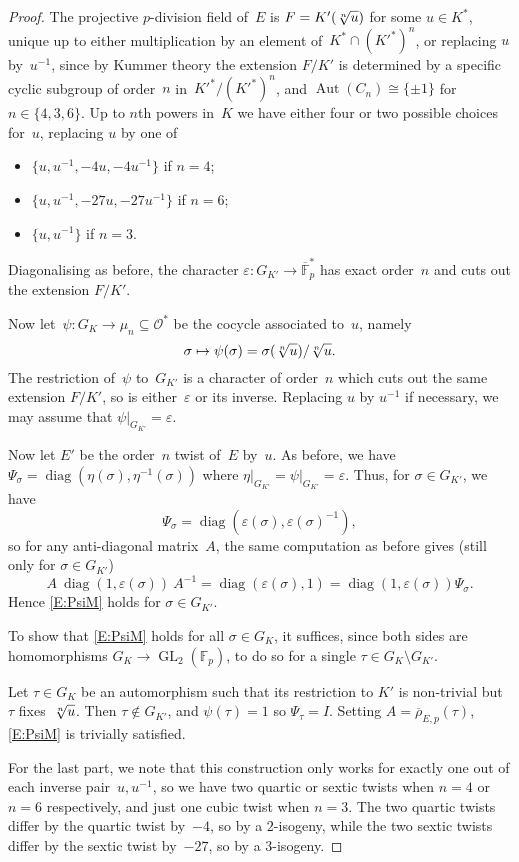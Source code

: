 \documentclass[12pt, reqno]{amsart}
\newcommand{\F}{\mathbb{F}}
\newcommand{\rhobar}{{\overline{\rho}}}
\newcommand{\eps}{\varepsilon}
\newcommand{\calO}{\mathcal{O}}
\DeclareMathOperator{\Aut}{Aut}
\newcommand{\GL}{\operatorname{GL}}
\newcommand{\diag}{{\operatorname{diag}}}
\numberwithin{equation}{section}
\theoremstyle{definition}
\theoremstyle{remark}
\begin{document}
\begin{proof}
The projective $p$-division field of~$E$ is $F=K'(\root n\of u)$ for
some $u\in K^*$, unique up to either multiplication by an element
of~$K^*\cap(K'^*)^n$, or replacing $u$ by~$u^{-1}$, since by Kummer
theory the extension $F/K'$ is determined by a specific cyclic subgroup
of order~$n$ in~$K'^*/(K'^*)^n$, and $\Aut(C_n)\cong\{\pm1\}$ for
$n\in\{4,3,6\}$.  Up to $n$th powers in~$K$ we have either four or two
possible choices for~$u$, replacing $u$ by one of
\begin{itemize}
  \item $\{u, u^{-1}, -4u, -4u^{-1}\}$ if $n=4$;
  \item $\{u, u^{-1}, -27u, -27u^{-1}\}$ if $n=6$;
  \item $\{u, u^{-1}\}$ if $n=3$.
\end{itemize}
Diagonalising as before, the character $\eps:G_{K'} \to
\overline{\F}_p^*$ has exact order~$n$ and cuts out the extension
$F/K'$.

Now let~$\psi:G_K\to \mu_n\subseteq\calO^*$ be the cocycle associated
to~$u$, namely
\[
\sigma\mapsto \psi(\sigma) = \sigma(\root n\of u)/\root n\of u.
\]
The restriction of~$\psi$ to~$G_{K'}$ is a character of order~$n$
which cuts out the same extension $F/K'$, so is either~$\eps$ or its
inverse.  Replacing $u$ by $u^{-1}$ if necessary, we may assume that
$\left.\psi\right|_{G_{K'}} = \eps$.

Now let $E'$ be the order~$n$ twist of~$E$ by~$u$.  As before, we have
$\Psi_{\sigma}=\diag(\eta(\sigma),\eta^{-1}(\sigma))$ where
$\left.\eta\right|_{G_{K'}} = \left.\psi\right|_{G_{K'}} = \eps$.
Thus, for $\sigma\in G_{K'}$, we have
\[
\Psi_{\sigma} = \diag(\eps(\sigma),\eps(\sigma)^{-1}),
\]
so for any anti-diagonal matrix~$A$, the same computation as before
gives (still only for $\sigma\in G_{K'}$)
\[
A\ \diag(1,\eps(\sigma))\ A^{-1} = \diag(\eps(\sigma),1) =
\diag(1,\eps(\sigma)) \Psi_{\sigma}.
\]
Hence \eqref{E:PsiM} holds for $\sigma\in G_{K'}$.

To show that \eqref{E:PsiM} holds for all $\sigma\in G_{K}$, it
suffices, since both sides are homomorphisms $G_K\to \GL_2(\F_p)$, to
do so for a single $\tau\in G_K\setminus G_{K'}$.

Let $\tau\in G_K$ be an automorphism such that its restriction to $K'$
is non-trivial but $\tau$ fixes~$\root n\of u$.  Then $\tau\notin
G_{K'}$, and $\psi(\tau)=1$ so $\Psi_\tau=I$.  Setting
$A=\rhobar_{E,p}(\tau)$, \eqref{E:PsiM} is trivially satisfied.

For the last part, we note that this construction only works for
exactly one out of each inverse pair~$u,u^{-1}$, so we have two
quartic or sextic twists when $n=4$ or $n=6$ respectively, and just
one cubic twist when $n=3$.  The two quartic twists differ by the
quartic twist by~$-4$, so by a $2$-isogeny, while the two sextic
twists differ by the sextic twist by~$-27$, so by a $3$-isogeny.
\end{proof}
\end{document}

